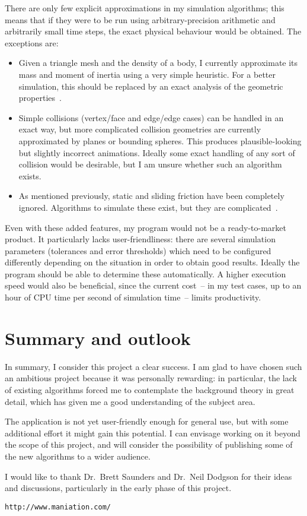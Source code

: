 There are only few explicit approximations in my simulation algorithms; this means that if they
were to be run using arbitrary-precision arithmetic and arbitrarily small time steps, the exact
physical behaviour would be obtained. The exceptions are:
\begin{itemize}
\item Given a triangle mesh and the density of a body, I currently approximate its mass and moment
    of inertia using a very simple heuristic. For a better simulation, this should be
    replaced by an exact analysis of the geometric properties~\cite{Mirtich:96}.
\item Simple collisions (vertex/face and edge/edge cases) can be handled in an exact way, but
    more complicated collision geometries are currently approximated by planes or bounding
    spheres. This produces plausible-looking but slightly incorrect animations. Ideally some
    exact handling of any sort of collision would be desirable, but I am unsure whether such
    an algorithm exists.
\item As mentioned previously, static and sliding friction have been completely ignored.
    Algorithms to simulate these exist, but they are complicated~\cite{Baraff:PhD}.
\end{itemize}

Even with these added features, my program would not be a ready-to-market product. It particularly
lacks user-friendliness: there are several simulation parameters (tolerances and error thresholds)
which need to be configured differently depending on the situation in order to obtain good
results. Ideally the program should be able to determine these automatically. A higher execution
speed would also be beneficial, since the current cost~-- in my test cases, up to an hour of CPU
time per second of simulation time~-- limits productivity.

\section{Summary and outlook}

In summary, I consider this project a clear success. I am glad to have chosen such an ambitious
project because it was personally rewarding: in particular, the lack of existing algorithms
forced me to contemplate the background theory in great detail, which has given me a good
understanding of the subject area.

The application is not yet user-friendly enough for general use, but with some additional effort
it might gain this potential. I can envisage working on it beyond the scope of this project,
and will consider the possibility of publishing some of the new algorithms to a wider audience.

I would like to thank Dr.~Brett Saunders and Dr.~Neil Dodgson for their ideas and discussions,
particularly in the early phase of this project.

\vspace{20pt}
\centerline{\texttt{http://www.maniation.com/}}
